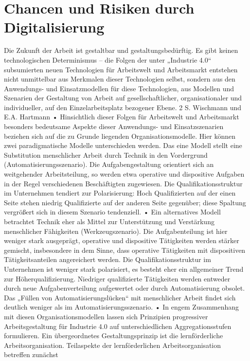 \chapter{Chancen und Risiken durch Digitalisierung}
Die Zukunft der Arbeit ist gestaltbar und gestaltungsbedürftig. Es gibt keinen technologischen Determinismus – die Folgen der unter „Industrie 4.0“ subsumierten neuen
Technologien für Arbeitswelt und Arbeitsmarkt entstehen nicht unmittelbar aus Merkmalen dieser Technologien selbst, sondern aus den Anwendungs- und Einsatzmodellen
für diese Technologien, aus Modellen und Szenarien der Gestaltung von Arbeit auf
gesellschaftlicher, organisationaler und individueller, auf den Einzelarbeitsplatz bezogener Ebene.
2 S. Wischmann und E.A. Hartmann
• Hinsichtlich dieser Folgen für Arbeitswelt und Arbeitsmarkt besonders bedeutsame
Aspekte dieser Anwendungs- und Einsatzszenarien beziehen sich auf die zu Grunde
liegenden Organisationsmodelle. Hier können zwei paradigmatische Modelle unterschieden werden. Das eine Modell stellt eine Substitution menschlicher Arbeit durch
Technik in den Vordergrund (Automatisierungsszenario). Die Aufgabengestaltung
orientiert sich an weitgehender Arbeitsteilung, so werden etwa operative und dispositive Aufgaben in der Regel verschiedenen Beschäftigten zugewiesen. Die Qualifikationsstruktur im Unternehmen tendiert zur Polarisierung: Hoch Qualifizierten auf der
einen Seite stehen niedrig Qualifizierte auf der anderen Seite gegenüber; diese Spaltung
vergrößert sich in diesem Szenario tendenziell.
• Ein alternatives Modell betrachtet Technik eher als Mittel zur Unterstützung und Verstärkung menschlicher Fähigkeiten (Werkzeugszenario). Die Aufgabenteilung ist hier
weniger stark ausgeprägt, operative und dispositive Tätigkeiten werden stärker gemischt,
insbesondere in dem Sinne, dass operative Tätigkeiten mit dispositiven Tätigkeitsanteilen angereichert werden. Die Qualifikationsstruktur im Unternehmen ist weniger stark
polarisiert, es besteht eher ein allgemeiner Trend zur Höherqualifizierung. Niedriger
qualifizierte Tätigkeiten werden entweder durch neue Aufgabenverteilung aufgewertet oder durch Automatisierung obsolet. Das „Füllen von Automatisierungslücken“ mit
menschlicher Arbeit findet sich deutlich weniger als im Automatisierungsszenario.
• In engem Zusammenhang mit diesen Organisationsmodellen lassen sich Prinzipien
progressiver Arbeitsgestaltung für Industrie 4.0 auf unterschiedlichen Aggregationsstufen formulieren. Ein übergeordnetes Gestaltungsprinzip ist die lernförderliche Arbeitsorganisation. Teilaspekte der lernförderlichen Arbeitsorganisation betreffen zunächst
